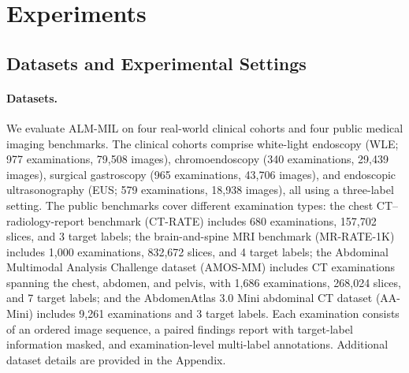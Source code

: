 \section{Experiments}
\label{sec:experiments}

\subsection{Datasets and Experimental Settings}
\label{sec:experimental_settings}

\paragraph{Datasets.}
We evaluate ALM-MIL on four real-world clinical cohorts and four public medical imaging benchmarks. The clinical cohorts comprise white-light endoscopy (WLE; 977 examinations, 79,508 images), chromoendoscopy (340 examinations, 29,439 images), surgical gastroscopy (965 examinations, 43,706 images), and endoscopic ultrasonography (EUS; 579 examinations, 18,938 images), all using a three-label setting. The public benchmarks cover different examination types: the chest CT--radiology-report benchmark (CT-RATE) includes 680 examinations, 157,702 slices, and 3 target labels; the brain-and-spine MRI benchmark (MR-RATE-1K) includes 1,000 examinations, 832,672 slices, and 4 target labels; the Abdominal Multimodal Analysis Challenge dataset (AMOS-MM) includes CT examinations spanning the chest, abdomen, and pelvis, with 1,686 examinations, 268,024 slices, and 7 target labels; and the AbdomenAtlas 3.0 Mini abdominal CT dataset (AA-Mini) includes 9,261 examinations and 3 target labels. Each examination consists of an ordered image sequence, a paired findings report with target-label information masked, and examination-level multi-label annotations. Additional dataset details are provided in the Appendix.


